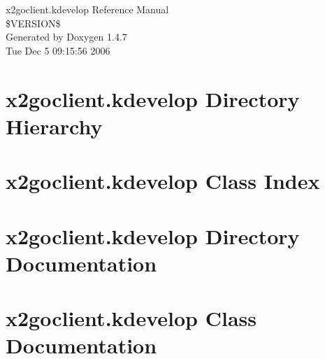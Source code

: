 \documentclass[a4paper]{book}
\begin{document}
\begin{titlepage}
\vspace*{7cm}
\begin{center}
{\Large x2goclient.kdevelop Reference Manual\\[1ex]\large \$VERSION\$ }\\
\vspace*{1cm}
{\large Generated by Doxygen 1.4.7}\\
\vspace*{0.5cm}
{\small Tue Dec 5 09:15:56 2006}\\
\end{center}
\end{titlepage}
\clearemptydoublepage
{}
\tableofcontents
\clearemptydoublepage
{}
\chapter{x2goclient.kdevelop Directory Hierarchy}

\chapter{x2goclient.kdevelop Class Index}

\chapter{x2goclient.kdevelop Directory Documentation}








\chapter{x2goclient.kdevelop Class Documentation}




\printindex
\end{document}
